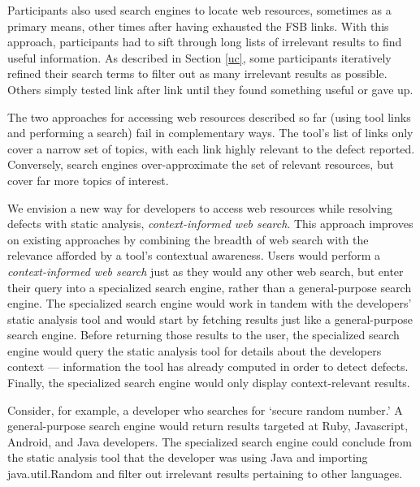 \documentclass[10pt,journal,compsoc]{IEEEtran}
\begin{document}

Participants also used search engines to locate web resources, sometimes as a primary means, other times after having exhausted the FSB links.
With this approach, participants had to sift through long lists of irrelevant results to find useful information.
As described in Section \ref{uc}, some participants iteratively refined their search terms to filter out as many irrelevant results as possible.
Others simply tested link after link until they found something useful or gave up.

The two approaches for accessing web resources described so far (using tool links and performing a search) fail in complementary ways. 
The tool's list of links only cover a narrow set of topics, with each link highly relevant to the defect reported. 
Conversely, search engines over-approximate the set of relevant resources, but cover far more topics of interest. 

We envision a new way for developers to access web resources while resolving defects with static analysis, \textit{context-informed web search}. This approach improves on existing approaches by combining the breadth of web search with the relevance afforded by a tool's contextual awareness.
Users would perform a \textit{context-informed web search} just as they would any other web search, but enter their query into a specialized search engine, rather than a general-purpose search engine.
The specialized search engine would work in tandem with the developers' static analysis tool and would start by fetching results just like a general-purpose search engine.
Before returning those results to the user, the specialized search engine would query the static analysis tool for details about the developers context --- information the tool has already computed in order to detect defects.
Finally, the specialized search engine would only display context-relevant results.

Consider, for example, a developer who searches for `secure random number.'
A general-purpose search engine would return results targeted at Ruby, Javascript, Android, and Java developers.
The specialized search engine could conclude from the static analysis tool that the developer was using Java and importing java.util.Random and filter out irrelevant results pertaining to other languages.
\end{document}
